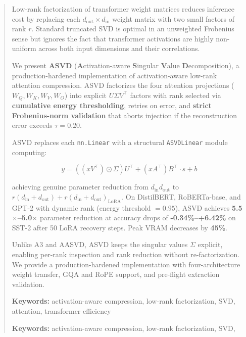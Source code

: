 \documentclass{article}
\begin{document}
\maketitle

\begin{abstract}
Low-rank factorization of transformer weight matrices reduces inference cost 
by replacing each $d_\text{out} \times d_\text{in}$ weight matrix with two 
small factors of rank $r$. Standard truncated SVD is optimal in an unweighted 
Frobenius sense but ignores the fact that transformer activations are highly 
non-uniform across both input dimensions and their correlations. 

We present \textbf{ASVD} (\textbf{A}ctivation-aware \textbf{S}ingular \textbf{V}alue 
\textbf{D}ecomposition), a production-hardened implementation of activation-aware 
low-rank attention compression. ASVD factorizes the four attention projections 
($W_Q, W_K, W_V, W_O$) into explicit $U \Sigma V^\top$ factors with rank 
selected via \textbf{cumulative energy thresholding}, retries on error, and 
\textbf{strict Frobenius-norm validation} that aborts injection if the reconstruction 
error exceeds $\tau = 0.20$.

ASVD replaces each \texttt{nn.Linear} with a structural \texttt{ASVDLinear} module computing:

\[
y = ((x V^\top) \odot \Sigma) U^\top + (x A^\top) B^\top \cdot s + b
\]

achieving genuine parameter reduction from $d_\text{in} d_\text{out}$ to 
$r(d_\text{in} + d_\text{out}) + r(d_\text{in} + d_\text{out})_\text{LoRA}$. 
On DistilBERT, RoBERTa-base, and GPT-2 with dynamic rank (energy threshold 
$= 0.95$), ASVD achieves \textbf{5.5$\times$--5.0$\times$} 
parameter reduction at accuracy drops of \textbf{-0.34\%--+6.42\%} on 
SST-2 after 50 LoRA recovery steps. Peak VRAM decreases 
by \textbf{45\%}.

Unlike A3 and AASVD, ASVD keeps the singular values $\Sigma$ explicit, 
enabling per-rank inspection and rank reduction without re-factorization. We 
provide a production-hardened implementation with four-architecture weight 
transfer, GQA and RoPE support, and pre-flight extraction validation.

\textbf{Keywords:} activation-aware compression, low-rank factorization, SVD, 
attention, transformer efficiency



\vspace{0.5em}
\noindent\textbf{Keywords:} activation-aware compression, low-rank factorization, SVD,
\end{abstract}
\end{document}
